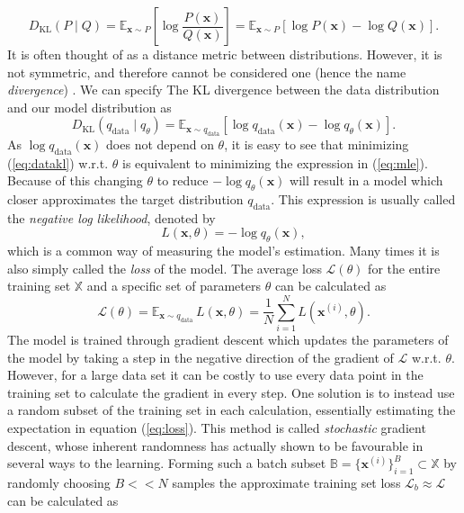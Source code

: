 \documentclass{report}
\begin{document}
\begin{equation}
    D_{\text{KL}}(P \mid Q) = \mathbb{E}_{\bm{x}\sim P}\left[ \log \frac{P(\bm{x})}{Q{(\bm{x})}} \right] = \mathbb{E}_{\bm{x}\sim P}\left[ \log P(\bm{x}) - \log Q(\bm{x}) \right].
\end{equation}
It is often thought of as a distance metric between distributions. However, it is not symmetric, and therefore cannot be considered one (hence the name \textit{divergence}) \cite{goodfellow2016deep}. We can specify The KL divergence between the data distribution and our model distribution as 
\begin{equation} \label{eq:datakl}
    D_{\text{KL}}(q_{\text{data}} \mid q_{\theta} ) = \mathbb{E}_{\bm{x} \sim q_{\text{data}}} [\log q_{\text{data}}(\bm{x}) - \log q_{\theta}(\bm{x})].
\end{equation}
As $\log q_{\text{data}}(\bm{x})$ does not depend on $\theta$, it is easy to see that minimizing (\ref{eq:datakl}) w.r.t. $\theta$ is equivalent to minimizing the expression in (\ref{eq:mle}). Because of this changing $\theta$ to reduce $-\log q_{\theta}(\bm{x})$ will result in a model which closer approximates the target distribution $q_{\text{data}}$. This expression is usually called the \textit{negative log likelihood}, denoted by
\begin{equation} \label{eq:nll}
    L(\bm{x}, \theta) = -\log q_{\theta}(\bm{x}),
\end{equation}
which is a common way of measuring the model's estimation. Many times it is also simply called the \textit{loss} of the model. The average loss $\mathcal{L}(\theta)$ for the entire training set $\mathbb{X}$ and a specific set of parameters $\theta$ can be calculated as
\begin{equation} \label{eq:loss}
    \mathcal{L}(\theta) = \mathbb{E}_{\bm{x}\sim q_{\text{data}}} \, L(\bm{x}, \theta) = 
    \frac{1}{N} \sum_{i=1}^{N} L(\bm{x}^{(i)}, \theta).
\end{equation}
The model is trained through gradient descent which updates the parameters of the model by taking a step in the negative direction of the gradient of $\mathcal{L}$ w.r.t. $\theta$. However, for a large data set it can be costly to use every data point in the training set to calculate the gradient in every step. One solution is to instead use a random subset of the training set in each calculation, essentially estimating the expectation in equation (\ref{eq:loss}). This method is called \textit{stochastic} gradient descent, whose inherent randomness has actually shown to be favourable in several ways to the learning. Forming such a batch subset $\mathbb{B}=\{\bm{x}^{(i)}\}_{i=1}^{B} \subset \mathbb{X}$ by randomly choosing $B << N$ samples the approximate training set loss $\mathcal{L}_b \approx \mathcal{L}$ can be calculated as
\end{document}
